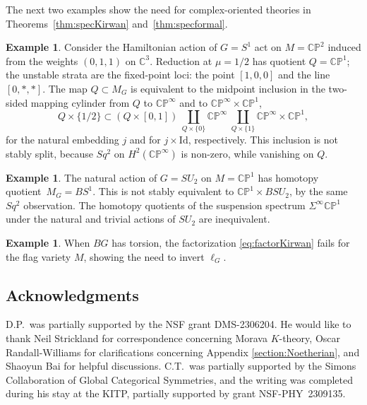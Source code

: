 \documentclass[11pt, reqno]{amsart}
\theoremstyle{plain}
\theoremstyle{definition}
\newtheorem{ex}[thm]{Example}
\begin{document}
The next two examples show the need for complex-oriented theories in Theorems~\ref{thm:specKirwan} and~\ref {thm:specformal}.

\begin{ex}
Consider the Hamiltonian action of $G=S^1$ act on $M=\mathbb{CP}^2$ induced from the weights 
$(0,1,1)$ on $\mathbb{C}^3$. Reduction at $\mu =1/2$ has quotient $Q=\mathbb{CP}^1$; the unstable 
strata are the fixed-point loci: the point $[1,0,0]$ and the line $[0,*,*]$. The map 
$Q\subset M_G$ is equivalent to the midpoint inclusion in the two-sided mapping cylinder 
from $Q$ to $\mathbb{CP}^\infty$ and to $\mathbb{CP}^\infty\times \mathbb{CP}^1$,
\[
Q\times\{1/2\} \subset \left(Q\times[0,1]\right) 	\:\textstyle{\coprod}_{Q\times\{0\}} \mathbb{CP}^\infty 
	\:\textstyle{\coprod}_{Q\times\{1\}} 
	\mathbb{CP}^\infty\times \mathbb{CP}^1,
\]
for the natural embedding $j$ and for $j\times\mathrm{Id}$, respectively. This inclusion is not stably 
split, because $Sq^2$ on $H^2(\mathbb{CP}^\infty)$ is non-zero, while  vanishing on $Q$.
\end{ex}

\begin{ex}
The natural action of $G=SU_2$ on $M=\mathbb{CP}^1$ has homotopy quotient~$M_G = BS^1$. 
This is not stably equivalent to $\mathbb{CP}^1\times BSU_2$, by the same $Sq^2$ observation. The homotopy quotients of the suspension spectrum $\Sigma^\infty \mathbb{CP}^1$ under 
the natural and trivial actions of $SU_2$ are inequivalent.  
\end{ex}

\begin{ex}
When $BG$ has torsion, the factorization \eqref{eq:factorKirwan} fails for the flag variety $M$, showing 
the need to invert $\ell_G$. 
\end{ex}

\subsection{Acknowledgments} 
D.P.~was partially supported by the NSF grant DMS-2306204.  He would like to thank Neil Strickland for 
correspondence concerning Morava $K$-theory,  Oscar Randall-Williams for clarifications 
concerning Appendix \ref{section:Noetherian},  and Shaoyun Bai for helpful discussions.  
C.T.~was partially supported by the Simons Collaboration of Global Categorical Symmetries, and the 
writing was completed during his stay at the KITP, partially supported by grant NSF-PHY~2309135. 
\end{document}
